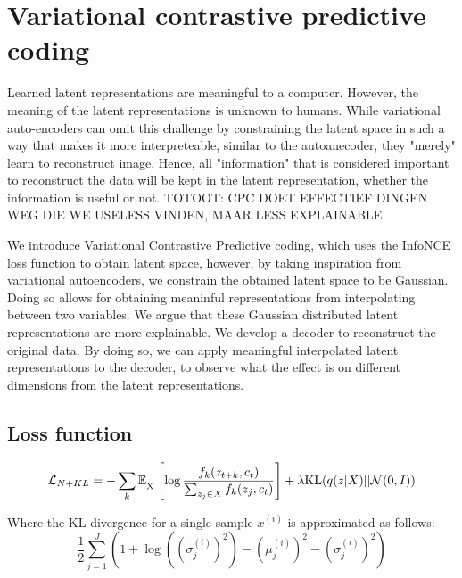\chapter{Variational contrastive predictive coding}
Learned latent representations are meaningful to a computer. However, the meaning of the latent representations is unknown to humans. While variational auto-encoders can omit this challenge by constraining the latent space in such a way that makes it more interpreteable, similar to the autoanecoder, they "merely" learn to reconstruct image. Hence, all "information" that is considered important to reconstruct the data will be kept in the latent representation, whether the information is useful or not. TOTOOT: CPC DOET EFFECTIEF DINGEN WEG DIE WE USELESS VINDEN, MAAR LESS EXPLAINABLE.

We introduce Variational Contrastive Predictive coding, which uses the InfoNCE loss function to obtain latent space, however, by taking inspiration from variational autoencoders, we constrain the obtained latent space to be Gaussian. Doing so allows for obtaining meaninful representations from interpolating between two variables.
We argue that these Gaussian distributed latent representations are more explainable. We develop a decoder to reconstruct the original data. By doing so, we can apply meaningful interpolated latent representations to the decoder, to observe what the effect is on different dimensions from the latent representations.

\section{Loss function}
\begin{equation} %
	\mathcal{L}_{N+KL} = - \sum_{k} \mathbb{E}_{\textsubscript{X}} \left[ \log \frac{f_k(z_{t+k}, c_t)}{\sum_{z_j \in X} f_k(z_j, c_t)} \right] + \lambda \text{KL}(q(z|X) || \mathcal{N}(0, I))
\end{equation}

Where the KL divergence for a single sample $x^{(i)}$ is approximated as follows:
\begin{equation}
	\frac{1}{2}\sum_{j=1}^J \left( 1 + \log((\sigma_j^{(i)})^2) - (\mu_j^{(i)})^2 - (\sigma_j^{(i)})^2 \right) 
\end{equation}




